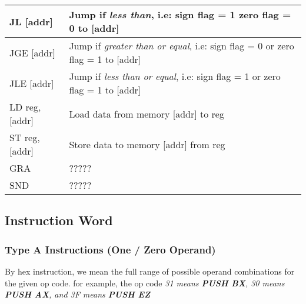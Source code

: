 \documentclass[a4paper, 11pt]{report}
\begin{document}
\begin{center}
\begin{tabular}{|l|p{27em}|}
        \hline
        JL [addr]            & Jump if \emph{less than}, i.e: sign flag = 1 zero flag = 0 to [addr]                \\
        \hline
        JGE [addr]           & Jump if \emph{greater than or equal}, i.e: sign flag = 0 or zero flag = 1 to [addr] \\
        \hline
        JLE [addr]           & Jump if \emph{less than or equal}, i.e: sign flag = 1 or zero flag = 1 to [addr]    \\
        \hline
        LD reg, [addr]       & Load data from memory [addr] to reg                                                 \\
        \hline
        ST reg, [addr]       & Store data to memory [addr] from reg                                                \\
        \hline
        GRA                  & ?????                                                                               \\
        \hline
        SND                  & ?????                                                                               \\
        \hline
    \end{tabular}
\end{center}
\subsection{Instruction Word}
\subsubsection{Type A Instructions (One / Zero Operand)}
By hex instruction, we mean the full range of possible operand combinations for the given op code. for example,
the op code \it{31} means \textbf{PUSH BX}, \it{30} means \textbf{PUSH AX}, and \it{3F} means
\textbf{PUSH EZ}
\end{document}
